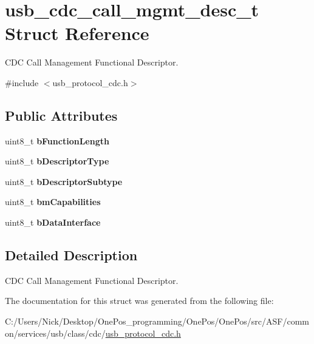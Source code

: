 \hypertarget{structusb__cdc__call__mgmt__desc__t}{\section{usb\-\_\-cdc\-\_\-call\-\_\-mgmt\-\_\-desc\-\_\-t Struct Reference}
\label{structusb__cdc__call__mgmt__desc__t}
}


C\-D\-C Call Management Functional Descriptor.  




{\ttfamily \#include $<$usb\-\_\-protocol\-\_\-cdc.\-h$>$}

\subsection*{Public Attributes}
\begin{DoxyCompactItemize}
\item 
\hypertarget{structusb__cdc__call__mgmt__desc__t_aafa3f523e8bc96b0cd539637d03aaf6b}{uint8\-\_\-t {\bfseries b\-Function\-Length}}\label{structusb__cdc__call__mgmt__desc__t_aafa3f523e8bc96b0cd539637d03aaf6b}

\item 
\hypertarget{structusb__cdc__call__mgmt__desc__t_a80069fa1e8a1c090b4906e4901a9c0d0}{uint8\-\_\-t {\bfseries b\-Descriptor\-Type}}\label{structusb__cdc__call__mgmt__desc__t_a80069fa1e8a1c090b4906e4901a9c0d0}

\item 
\hypertarget{structusb__cdc__call__mgmt__desc__t_aebf8887aeb7e00878112efe9ac6b14e2}{uint8\-\_\-t {\bfseries b\-Descriptor\-Subtype}}\label{structusb__cdc__call__mgmt__desc__t_aebf8887aeb7e00878112efe9ac6b14e2}

\item 
\hypertarget{structusb__cdc__call__mgmt__desc__t_ae6648388cc0a5e305a3e87ab62f9e24f}{uint8\-\_\-t {\bfseries bm\-Capabilities}}\label{structusb__cdc__call__mgmt__desc__t_ae6648388cc0a5e305a3e87ab62f9e24f}

\item 
\hypertarget{structusb__cdc__call__mgmt__desc__t_acb0a5cca915a2af2291864d772c9807a}{uint8\-\_\-t {\bfseries b\-Data\-Interface}}\label{structusb__cdc__call__mgmt__desc__t_acb0a5cca915a2af2291864d772c9807a}

\end{DoxyCompactItemize}


\subsection{Detailed Description}
C\-D\-C Call Management Functional Descriptor. 

The documentation for this struct was generated from the following file\-:\begin{DoxyCompactItemize}
\item 
C\-:/\-Users/\-Nick/\-Desktop/\-One\-Pos\-\_\-programming/\-One\-Pos/\-One\-Pos/src/\-A\-S\-F/common/services/usb/class/cdc/\hyperlink{usb__protocol__cdc_8h}{usb\-\_\-protocol\-\_\-cdc.\-h}\end{DoxyCompactItemize}

